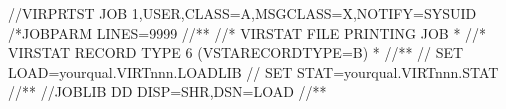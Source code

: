 \documentclass[letterpaper,10pt,english]{sphinxmanual}
\begin{document}
\begin{sphinxVerbatim}[commandchars=\\\{\}]
//VIRPRTST JOB 1,USER,CLASS=A,MSGCLASS=X,NOTIFY=\PYGZam{}SYSUID
/*JOBPARM LINES=9999
//*\PYGZhy{}\PYGZhy{}\PYGZhy{}\PYGZhy{}\PYGZhy{}\PYGZhy{}\PYGZhy{}\PYGZhy{}\PYGZhy{}\PYGZhy{}\PYGZhy{}\PYGZhy{}\PYGZhy{}\PYGZhy{}\PYGZhy{}\PYGZhy{}\PYGZhy{}\PYGZhy{}\PYGZhy{}\PYGZhy{}\PYGZhy{}\PYGZhy{}\PYGZhy{}\PYGZhy{}\PYGZhy{}\PYGZhy{}\PYGZhy{}\PYGZhy{}\PYGZhy{}\PYGZhy{}\PYGZhy{}\PYGZhy{}\PYGZhy{}\PYGZhy{}\PYGZhy{}\PYGZhy{}\PYGZhy{}\PYGZhy{}\PYGZhy{}\PYGZhy{}\PYGZhy{}\PYGZhy{}\PYGZhy{}\PYGZhy{}\PYGZhy{}\PYGZhy{}\PYGZhy{}\PYGZhy{}\PYGZhy{}\PYGZhy{}\PYGZhy{}\PYGZhy{}\PYGZhy{}\PYGZhy{}\PYGZhy{}\PYGZhy{}\PYGZhy{}\PYGZhy{}\PYGZhy{}\PYGZhy{}*
//* VIRSTAT FILE PRINTING JOB *
//* VIRSTAT RECORD TYPE 6 (VSTA\PYGZhy{}RECORD\PYGZhy{}TYPE=\PYGZsq{}B\PYGZsq{}) *
//*\PYGZhy{}\PYGZhy{}\PYGZhy{}\PYGZhy{}\PYGZhy{}\PYGZhy{}\PYGZhy{}\PYGZhy{}\PYGZhy{}\PYGZhy{}\PYGZhy{}\PYGZhy{}\PYGZhy{}\PYGZhy{}\PYGZhy{}\PYGZhy{}\PYGZhy{}\PYGZhy{}\PYGZhy{}\PYGZhy{}\PYGZhy{}\PYGZhy{}\PYGZhy{}\PYGZhy{}\PYGZhy{}\PYGZhy{}\PYGZhy{}\PYGZhy{}\PYGZhy{}\PYGZhy{}\PYGZhy{}\PYGZhy{}\PYGZhy{}\PYGZhy{}\PYGZhy{}\PYGZhy{}\PYGZhy{}\PYGZhy{}\PYGZhy{}\PYGZhy{}\PYGZhy{}\PYGZhy{}\PYGZhy{}\PYGZhy{}\PYGZhy{}\PYGZhy{}\PYGZhy{}\PYGZhy{}\PYGZhy{}\PYGZhy{}\PYGZhy{}\PYGZhy{}\PYGZhy{}\PYGZhy{}\PYGZhy{}\PYGZhy{}\PYGZhy{}\PYGZhy{}\PYGZhy{}\PYGZhy{}*
// SET LOAD=yourqual.VIRTnnn.LOADLIB
// SET STAT=yourqual.VIRTnnn.STAT
//*\PYGZhy{}\PYGZhy{}\PYGZhy{}\PYGZhy{}\PYGZhy{}\PYGZhy{}\PYGZhy{}\PYGZhy{}\PYGZhy{}\PYGZhy{}\PYGZhy{}\PYGZhy{}\PYGZhy{}\PYGZhy{}\PYGZhy{}\PYGZhy{}\PYGZhy{}\PYGZhy{}\PYGZhy{}\PYGZhy{}\PYGZhy{}\PYGZhy{}\PYGZhy{}\PYGZhy{}\PYGZhy{}\PYGZhy{}\PYGZhy{}\PYGZhy{}\PYGZhy{}\PYGZhy{}\PYGZhy{}\PYGZhy{}\PYGZhy{}\PYGZhy{}\PYGZhy{}\PYGZhy{}\PYGZhy{}\PYGZhy{}\PYGZhy{}\PYGZhy{}\PYGZhy{}\PYGZhy{}\PYGZhy{}\PYGZhy{}\PYGZhy{}\PYGZhy{}\PYGZhy{}\PYGZhy{}\PYGZhy{}\PYGZhy{}\PYGZhy{}\PYGZhy{}\PYGZhy{}\PYGZhy{}\PYGZhy{}\PYGZhy{}\PYGZhy{}\PYGZhy{}\PYGZhy{}\PYGZhy{}*
//JOBLIB DD DISP=SHR,DSN=\PYGZam{}LOAD
//*\PYGZhy{}\PYGZhy{}\PYGZhy{}\PYGZhy{}\PYGZhy{}\PYGZhy{}\PYGZhy{}\PYGZhy{}\PYGZhy{}\PYGZhy{}\PYGZhy{}\PYGZhy{}\PYGZhy{}\PYGZhy{}\PYGZhy{}\PYGZhy{}\PYGZhy{}\PYGZhy{}\PYGZhy{}\PYGZhy{}\PYGZhy{}\PYGZhy{}\PYGZhy{}\PYGZhy{}\PYGZhy{}\PYGZhy{}\PYGZhy{}\PYGZhy{}\PYGZhy{}\PYGZhy{}\PYGZhy{}\PYGZhy{}\PYGZhy{}\PYGZhy{}\PYGZhy{}\PYGZhy{}\PYGZhy{}\PYGZhy{}\PYGZhy{}\PYGZhy{}\PYGZhy{}\PYGZhy{}\PYGZhy{}\PYGZhy{}\PYGZhy{}\PYGZhy{}\PYGZhy{}\PYGZhy{}\PYGZhy{}\PYGZhy{}\PYGZhy{}\PYGZhy{}\PYGZhy{}\PYGZhy{}\PYGZhy{}\PYGZhy{}\PYGZhy{}\PYGZhy{}\PYGZhy{}\PYGZhy{}*

\end{sphinxVerbatim}
\end{document}
